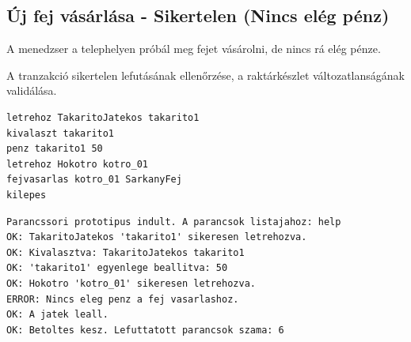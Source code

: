 \subsection{Új fej vásárlása - Sikertelen (Nincs elég pénz)}
\begin{test-case-description}
    A menedzser a telephelyen próbál meg fejet vásárolni, de nincs rá elég pénze.
\end{test-case-description}
\begin{test-case-function}
    A tranzakció sikertelen lefutásának ellenőrzése, a raktárkészlet változatlanságának validálása.
\end{test-case-function}
\begin{test-case-input}
\begin{verbatim}
letrehoz TakaritoJatekos takarito1
kivalaszt takarito1
penz takarito1 50
letrehoz Hokotro kotro_01
fejvasarlas kotro_01 SarkanyFej
kilepes
\end{verbatim}
\end{test-case-input}
\begin{test-case-output}
\begin{verbatim}
Parancssori prototipus indult. A parancsok listajahoz: help
OK: TakaritoJatekos 'takarito1' sikeresen letrehozva.
OK: Kivalasztva: TakaritoJatekos takarito1
OK: 'takarito1' egyenlege beallitva: 50
OK: Hokotro 'kotro_01' sikeresen letrehozva.
ERROR: Nincs eleg penz a fej vasarlashoz.
OK: A jatek leall.
OK: Betoltes kesz. Lefuttatott parancsok szama: 6
\end{verbatim}
\end{test-case-output}

